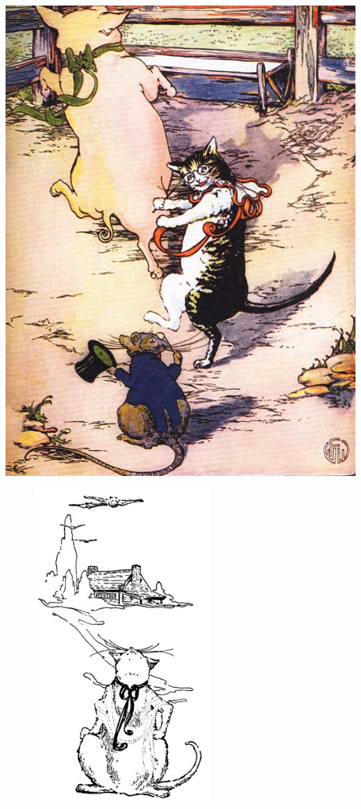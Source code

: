 \documentclass[letterpaper, 10pt, openany]{memoir}
\begin{document}
\newpage
\begin{center}
	\includegraphics[width=\textwidth]{image_050_1.jpg}
\end{center}

\newpage
\begin{figure}
	\includegraphics[width=0.6\textwidth]{image_024.jpg}
\end{figure}
\end{document}
